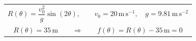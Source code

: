 \documentclass[border=12pt]{standalone}
\begin{document}
\color{weeknavy}
\begin{tabular}{c}
$R(\theta)=\dfrac{v_0^2}{g}\sin(2\theta),\qquad v_0=20\,\mathrm{m\,s^{-1}},\quad g=9.81\,\mathrm{m\,s^{-2}}$\\[8pt]
$R(\theta)=35\,\mathrm{m}\qquad\Longrightarrow\qquad f(\theta)=R(\theta)-35\,\mathrm{m}=0$
\end{tabular}
\end{document}
